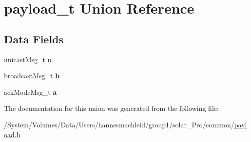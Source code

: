 \hypertarget{unionpayload__t}{}\section{payload\+\_\+t Union Reference}
\label{unionpayload__t}
\subsection*{Data Fields}
\begin{DoxyCompactItemize}
\item 
\mbox{\label{unionpayload__t_af9c5bdfa590263b1b7f93cf83a354e42}} 
unicast\+Msg\+\_\+t {\bfseries u}
\item 
\mbox{\label{unionpayload__t_af95f0b6994bdade203343ecd09e12cb8}} 
broadcast\+Msg\+\_\+t {\bfseries b}
\item 
\mbox{\label{unionpayload__t_a30febe9d902b61ec60ae9382a4c14d05}} 
ack\+Mode\+Msg\+\_\+t {\bfseries a}
\end{DoxyCompactItemize}


The documentation for this union was generated from the following file\+:\begin{DoxyCompactItemize}
\item 
/\+System/\+Volumes/\+Data/\+Users/hannesmachleid/group1/solar\+\_\+\+Pro/common/\mbox{\hyperlink{payload_8h}{payload.\+h}}\end{DoxyCompactItemize}
